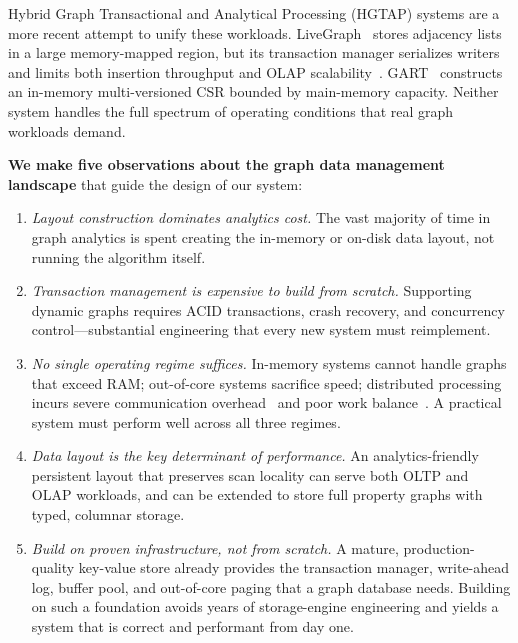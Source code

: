 Hybrid Graph Transactional and Analytical Processing (HGTAP) systems are a more recent attempt to unify these workloads.
LiveGraph~\cite{zhu2019livegraph} stores adjacency lists in a large memory-mapped region, but its transaction manager serializes writers and limits both insertion throughput and OLAP scalability~\cite{libinzhou2025GTX,crotty2022you}.
GART~\cite{shen2023bridging} constructs an in-memory multi-versioned CSR bounded by main-memory capacity.
Neither system handles the full spectrum of operating conditions that real graph workloads demand.

\textbf{We make five observations about the graph data management landscape} that guide the design of our system:
\begin{enumerate}
  \item \textit{Layout construction dominates analytics cost.} The vast majority of time in graph analytics is spent creating the in-memory or on-disk data layout, not running the algorithm itself.
  \item \textit{Transaction management is expensive to build from scratch.} Supporting dynamic graphs requires ACID transactions, crash recovery, and concurrency control---substantial engineering that every new system must reimplement.
  \item \textit{No single operating regime suffices.} In-memory systems cannot handle graphs that exceed RAM; out-of-core systems sacrifice speed; distributed processing incurs severe communication overhead~\cite{mcsherry2015scalability,beamer2016understanding} and poor work balance~\cite{hajidehi2023cuttana}. A practical system must perform well across all three regimes.
  \item \textit{Data layout is the key determinant of performance.} An analytics-friendly persistent layout that preserves scan locality can serve both OLTP and OLAP workloads, and can be extended to store full property graphs with typed, columnar storage.
  \item \textit{Build on proven infrastructure, not from scratch.} A mature, production-quality key-value store already provides the transaction manager, write-ahead log, buffer pool, and out-of-core paging that a graph database needs. Building on such a foundation avoids years of storage-engine engineering and yields a system that is correct and performant from day one.
\end{enumerate}

